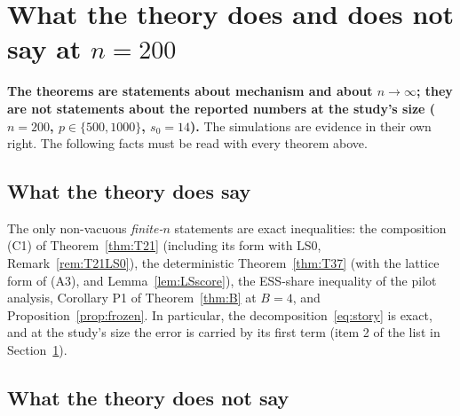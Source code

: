 \documentclass[11pt]{article}
\theoremstyle{definition}
\theoremstyle{remark}
\begin{document}
\section{What the theory does and does not say at $n=200$}\label{sec:disclosure}

\textbf{The theorems are statements about mechanism and about $n\to\infty$; they are not statements about the reported numbers at the study's size
($n=200$, $p\in\{500,1000\}$, $s_0=14$).} The simulations are evidence in their own right. The following facts must be read with every theorem above.

\subsection{What the theory does say}

The only non-vacuous \emph{finite-$n$} statements are exact inequalities: the composition (C1) of Theorem~\ref{thm:T21} (including its form with LS0, Remark~\ref{rem:T21LS0}), the
deterministic Theorem~\ref{thm:T37} (with the lattice form of (A3), and Lemma~\ref{lem:LSscore}), the ESS-share inequality of the pilot analysis, Corollary P1 of Theorem~\ref{thm:B} at $B=4$, and Proposition~\ref{prop:frozen}.
In particular, the decomposition~\eqref{eq:story} is exact, and at the study's size the error is carried by its first term (item 2 of the list in Section~\ref{sec:disclosure}).

\subsection{What the theory does not say}
\end{document}
